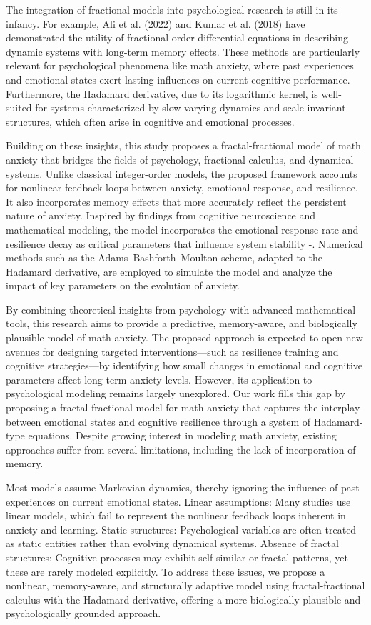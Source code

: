 \documentclass[10pt]{NSP1}
\begin{document}
The integration of fractional models into psychological research is still in its infancy. For example, Ali et al. (2022) \cite{ali22} and Kumar et al. (2018) \cite{kumar18} have demonstrated the utility of fractional-order differential equations in describing dynamic systems with long-term memory effects. These methods are particularly relevant for psychological phenomena like math anxiety, where past experiences and emotional states exert lasting influences on current cognitive performance. Furthermore, the Hadamard derivative, due to its logarithmic kernel, is well-suited for systems characterized by slow-varying dynamics and scale-invariant structures, which often arise in cognitive and emotional processes.

Building on these insights, this study proposes a fractal-fractional model of math anxiety that bridges the fields of psychology, fractional calculus, and dynamical systems. Unlike classical integer-order models, the proposed framework accounts for nonlinear feedback loops between anxiety, emotional response, and resilience. It also incorporates memory effects that more accurately reflect the persistent nature of anxiety. Inspired by findings from cognitive neuroscience and mathematical modeling, the model incorporates the emotional response rate and resilience decay as critical parameters that influence system stability \cite{khan21}-\cite{atangana17}. Numerical methods such as the Adams--Bashforth--Moulton scheme, adapted to the Hadamard derivative, are employed to simulate the model and analyze the impact of key parameters on the evolution of anxiety.

By combining theoretical insights from psychology with advanced mathematical tools, this research aims to provide a predictive, memory-aware, and biologically plausible model of math anxiety. The proposed approach is expected to open new avenues for designing targeted interventions---such as resilience training and cognitive strategies---by identifying how small changes in emotional and cognitive parameters affect long-term anxiety levels. However, its application to psychological modeling remains largely unexplored.
Our work fills this gap by proposing a fractal-fractional model for math anxiety that captures the interplay between emotional states and cognitive resilience through a system of Hadamard-type equations. Despite growing interest in modeling math anxiety, existing approaches suffer from several limitations, including the lack of incorporation of memory. 

Most models assume Markovian dynamics, thereby ignoring the influence of past experiences on current emotional states. Linear assumptions: Many studies use linear models, which fail to represent the nonlinear feedback loops inherent in anxiety and learning. Static structures: Psychological variables are often treated as static entities rather than evolving dynamical systems. Absence of fractal structures: Cognitive processes may exhibit self-similar or fractal patterns, yet these are rarely modeled explicitly. To address these issues, we propose a nonlinear, memory-aware, and structurally adaptive model using fractal-fractional calculus with the Hadamard derivative, offering a more biologically plausible and psychologically grounded approach.
\end{document}
